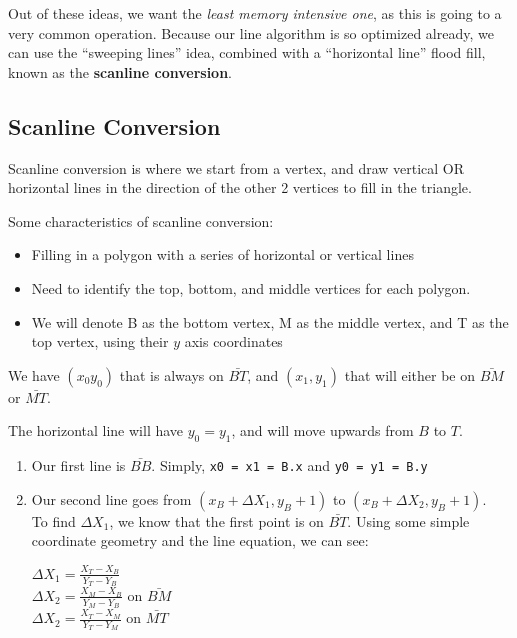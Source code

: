 \documentclass[11pt,fleqn]{article}
\theoremstyle{definition}
\begin{document}
Out of these ideas, we want the \textit{least memory intensive one}, as this is going
to a very common operation. Because our line algorithm is so optimized already, we
can use the ``sweeping lines'' idea, combined with a ``horizontal line'' flood fill,
known as the \textbf{scanline conversion}.

\subsection{Scanline Conversion}

Scanline conversion is where we start from a vertex, and draw vertical OR horizontal
lines in the direction of the other 2 vertices to fill in the triangle.

Some characteristics of scanline conversion:

\begin{itemize}
    \item Filling in a polygon with a series of horizontal or vertical lines
    \item Need to identify the top, bottom, and middle vertices for each polygon.
    \item We will denote B as the bottom vertex, M as the middle vertex, and T as the
        top vertex, using their $y$ axis coordinates
\end{itemize}

We have $(x_0 y_0)$ that is always on $\bar{BT}$, and $(x_1, y_1)$ that will either
be on $\bar{BM}$ or $\bar{MT}$.

The horizontal line will have $y_0 = y_1$, and will move upwards from $B$ to $T$.

\begin{enumerate}
    \item Our first line is $\bar{BB}$. Simply, \texttt{x0 = x1 = B.x} and \texttt{y0
        = y1 = B.y}
    \item Our second line goes from $(x_B + \Delta X_1, y_B + 1)$ to $(x_B + \Delta
        X_2, y_B + 1)$. \\
        \newline
        To find $\Delta X_1$, we know that the first point is on $\bar{BT}$. Using
        some simple coordinate geometry and the line equation, we can see: \\
        \begin{center}
            $\Delta X_1 = \frac{X_T - X_B}{Y_T - Y_B}$ \\
            $\Delta X_2 = \frac{X_M - X_B}{Y_M - Y_B}$ on $\bar{BM}$ \\
            $\Delta X_2 = \frac{X_T - X_M}{Y_T - Y_M}$ on $\bar{MT}$
        \end{center}
\end{enumerate}
\end{document}

